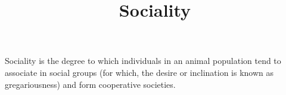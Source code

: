\documentclass[a4paper]{article}
\title{Sociality}
\date{}
\begin{document}
\maketitle
    Sociality is the degree to which individuals in an animal population tend to associate in social groups (for which, the desire or inclination is known as gregariousness) and form cooperative societies. 
\end{document}
